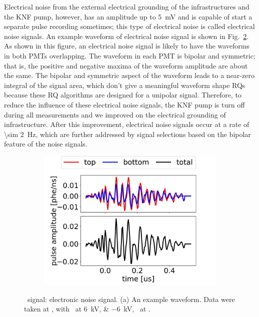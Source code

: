Electrical noise from the external electrical grounding of the infrastructures and the KNF pump, however, has an amplitude up to \SI{5}{\mV} and is capable of start a separate pulse recording sometimes; this type of electrical noise is called electrical noise signals. An example waveform of electrical noise signal is shown in Fig.~\ref{fig:noise}. As shown in this figure, an electrical noise signal is likely to have the waveforms in both PMTs overlapping. %
The waveform in each PMT is bipolar and symmetric; that is, the positive and negative maxima of the waveform amplitude are about the same. The bipolar and symmetric aspect of the waveform leads to a near-zero integral of the signal area, which don't give a meaningful waveform shape RQs because these RQ algorithms are designed for a unipolar signal. 
Therefore, to reduce the influence of these electrical noise signals, the KNF pump is turn off during all measurements and we improved on the electrical grounding of infrastructure. After this improvement, electrical noise signals occur at a rate of \SI{\sim 2}{\Hz}, which are further addressed by signal selections based on the bipolar feature of the noise signals. 

\begin{figure}[!p]
    \centering
	\begin{subfigure}[b]{0.7\textwidth}
	\centering
	\includegraphics[width=\figurewidth,clip,trim={0 0 0 0}]{Figures/GasTest/exampleWaveforms/proc64767id00000034.jpg}%
	\caption{}
	\label{fig:}
\end{subfigure}
\caption[\gtest\ signal: electronic noise.]{\gtest\ signal: electronic noise signal. (a) An example waveform. Data were taken at , with \opvtvb\ at \SIlist{+6;-6}{kV}, \opgd\ at \standarddensity .%
}
\label{fig:noise}
\end{figure}

